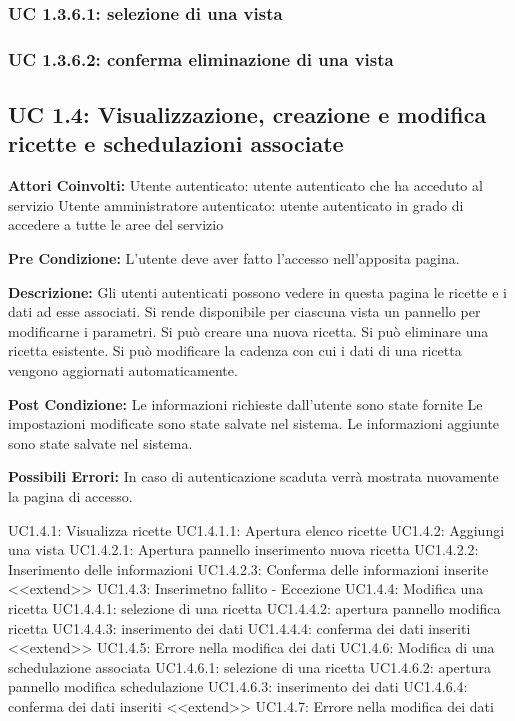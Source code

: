 \subsubsection{UC 1.3.6.1: selezione di una vista}

\subsubsection{UC 1.3.6.2: conferma eliminazione di una vista}

\subsection{UC 1.4: Visualizzazione, creazione e modifica ricette e schedulazioni associate}

\textbf{Attori Coinvolti:}
Utente autenticato: utente autenticato che ha acceduto al servizio
Utente amministratore autenticato: utente autenticato in grado di accedere a tutte le aree del servizio

\textbf{Pre Condizione:}
        L’utente deve aver fatto l’accesso nell’apposita pagina.

\textbf{Descrizione:}
        Gli utenti autenticati possono vedere in questa pagina le ricette e i dati ad esse associati. 
Si rende disponibile per ciascuna vista un pannello per modificarne i parametri. 
Si può creare una nuova ricetta. 
Si può eliminare una ricetta esistente.
Si può modificare la cadenza con cui i dati di una ricetta vengono aggiornati automaticamente.

\textbf{Post Condizione:}
        Le informazioni richieste dall’utente sono state fornite
Le impostazioni modificate sono state salvate nel sistema.
Le informazioni aggiunte sono state salvate nel sistema.

\textbf{Possibili Errori:}
    In caso di autenticazione scaduta verrà mostrata nuovamente la pagina di accesso.

UC1.4.1: Visualizza ricette
UC1.4.1.1: Apertura elenco ricette
UC1.4.2: Aggiungi una vista
UC1.4.2.1: Apertura pannello inserimento nuova ricetta
UC1.4.2.2: Inserimento delle informazioni 
UC1.4.2.3: Conferma delle informazioni inserite
<<extend>>
UC1.4.3: Inserimetno fallito - Eccezione
UC1.4.4: Modifica una ricetta
UC1.4.4.1: selezione di una ricetta
UC1.4.4.2: apertura pannello modifica ricetta
UC1.4.4.3: inserimento dei dati
UC1.4.4.4: conferma dei dati inseriti
<<extend>>
UC1.4.5: Errore nella modifica dei dati
UC1.4.6: Modifica di una schedulazione associata
UC1.4.6.1: selezione di una ricetta
UC1.4.6.2: apertura pannello modifica schedulazione
UC1.4.6.3: inserimento dei dati
UC1.4.6.4: conferma dei dati inseriti
<<extend>>
UC1.4.7: Errore nella modifica dei dati

